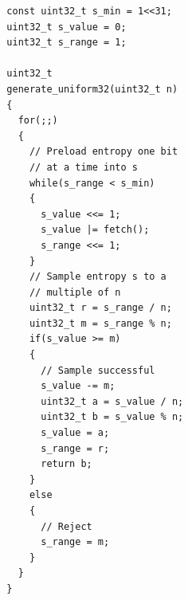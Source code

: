 \documentclass[lettersize,journal]{IEEEtran}
\begin{document}
\begin{verbatim}
  const uint32_t s_min = 1<<31;
  uint32_t s_value = 0;
  uint32_t s_range = 1;

  uint32_t
  generate_uniform32(uint32_t n)
  {
    for(;;)
    {
      // Preload entropy one bit 
      // at a time into s
      while(s_range < s_min)
      {
        s_value <<= 1;
        s_value |= fetch();
        s_range <<= 1;
      }
      // Sample entropy s to a
      // multiple of n
      uint32_t r = s_range / n;
      uint32_t m = s_range % n;
      if(s_value >= m)
      {
        // Sample successful
        s_value -= m;
        uint32_t a = s_value / n;
        uint32_t b = s_value % n;
        s_value = a;
        s_range = r; 
        return b;
      }
      else
      {
        // Reject
        s_range = m;
      }
    }
  }
\end{verbatim}
\end{document}
